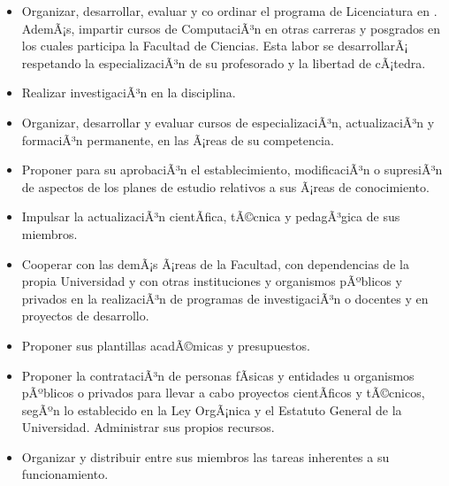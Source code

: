 \begin{itemize}
\item Organizar, desarrollar, evaluar y co ordinar el programa de Licenciatura en \SchoolShortName. AdemÃ¡s, impartir cursos de ComputaciÃ³n en otras carreras y posgrados en los cuales participa la Facultad de Ciencias. Esta labor se desarrollarÃ¡ respetando la especializaciÃ³n de su profesorado y la libertad de cÃ¡tedra. 

\item Realizar investigaciÃ³n en la disciplina.

\item Organizar, desarrollar y evaluar cursos de especializaciÃ³n, actualizaciÃ³n y formaciÃ³n permanente, en las Ã¡reas de su competencia.

\item Proponer para su aprobaciÃ³n el establecimiento, modificaciÃ³n o supresiÃ³n de aspectos de los planes de estudio relativos a sus Ã¡reas de conocimiento.

\item Impulsar la actualizaciÃ³n cientÃ­fica, tÃ©cnica y pedagÃ³gica de sus miembros.

\item Cooperar con las demÃ¡s Ã¡reas de la Facultad, con dependencias de la propia Universidad y con otras instituciones y organismos pÃºblicos y privados en la realizaciÃ³n de programas de investigaciÃ³n o docentes y en proyectos de desarrollo.

\item Proponer sus plantillas acadÃ©micas y presupuestos.

\item Proponer la contrataciÃ³n de personas fÃ­sicas y entidades u organismos pÃºblicos o privados para llevar a cabo proyectos cientÃ­ficos y tÃ©cnicos, segÃºn lo establecido en la Ley OrgÃ¡nica y el Estatuto General de la Universidad. Administrar sus propios recursos.

\item Organizar y distribuir entre sus miembros las tareas inherentes a su funcionamiento.
\end{itemize}
